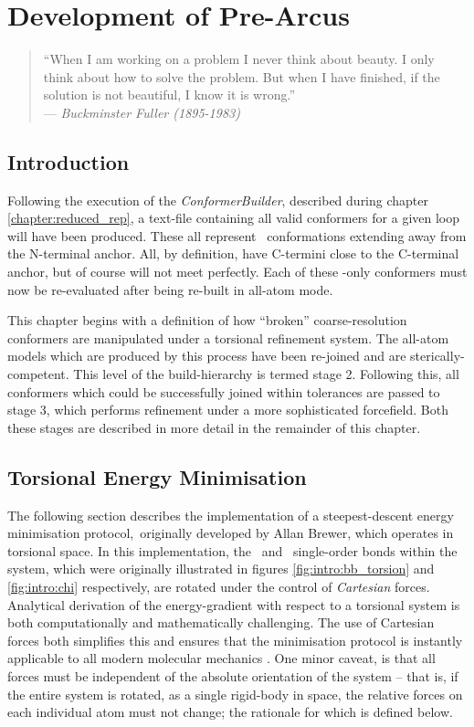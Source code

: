 \chapter{Development of Pre-Arcus}
\label{chapter:prearcus}

\begin{quote}
``When I am working on a problem I never think about beauty. I only think about how to solve the problem. But when I have finished, if the solution is not beautiful, I know it is wrong.'' \\
--- \textit{Buckminster Fuller (1895-1983)}
\end{quote}

\section{Introduction}

Following the execution of the \textsl{ConformerBuilder}, described during chapter \ref{chapter:reduced_rep}, a text-file containing all valid conformers for a given loop will have been produced.
These all represent \mainchain\ conformations extending away from the N-terminal anchor. All, by definition, have C-termini close to the C-terminal anchor, but of course will not meet perfectly. Each of these \mainchain-only conformers must now be re-evaluated
after being re-built in all-atom mode. 

This chapter begins with a definition of how ``broken'' coarse-resolution conformers are manipulated under a torsional refinement system. The all-atom models which are produced by this process have been re-joined and are sterically-competent. This level of the build-hierarchy is termed stage 2. Following this, all conformers which could be successfully joined
within tolerances are passed to stage 3, which performs refinement under a more sophisticated forcefield.
Both these stages are described in more detail in the remainder of this chapter.

\section{Torsional Energy Minimisation}

The following section describes the implementation of a steepest-descent energy minimisation protocol,~originally developed by Allan Brewer\cite{THESIS:BREWER}, which operates in torsional space. In this implementation, the \mainchain\ and \sidechain\ single-order bonds within the system, which were originally illustrated in figures \ref{fig:intro:bb_torsion} and \ref{fig:intro:chi} respectively, are  rotated under the control of \emph{Cartesian} forces. Analytical derivation of the energy-gradient with respect to a torsional system is both computationally and mathematically challenging. The use of Cartesian forces both simplifies this and ensures that the minimisation protocol is instantly applicable to all modern molecular mechanics \forcefields. One minor caveat,  is that all forces must be independent of the absolute orientation of the system -- that is, if the entire system is rotated, as a single rigid-body in space, the relative forces on each individual atom must not change; the rationale for which is defined below.

